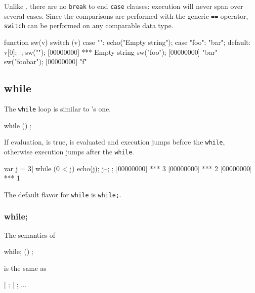 Unlike \C, there are no \lstinline|break| to end \lstinline|case|
clauses: execution will never span over several cases.  Since the
comparisons are performed with the generic \lstinline|==| operator,
\lstinline|switch| can be performed on any comparable data type.

\begin{urbiscript}[firstnumber=last]
function sw(v)
{
  switch (v)
  {
    case "":
      echo("Empty string");
    case "foo":
      "bar";
    default:
      v[0];
  }
}|;
sw("");
[00000000] *** Empty string
sw("foo");
[00000000] "bar"
sw("foobar");
[00000000] "f"
\end{urbiscript}

\subsection{while}

The \lstinline|while| loop is similar to \C's one.

\begin{urbiunchecked}[frame=, backgroundcolor=, ]
while ()
  ;
\end{urbiunchecked}

If  evaluation, is true,  is evaluated and
execution jumps before the \lstinline|while|, otherwise execution
jumps after the \lstinline|while|.

\begin{urbiscript}[firstnumber=last]
var j = 3|
while (0 < j)
{
  echo(j);
  j--;
};
[00000000] *** 3
[00000000] *** 2
[00000000] *** 1
\end{urbiscript}

The default flavor for \lstinline|while| is \lstinline|while;|.

\subsubsection{while;}

The semantics of

\begin{urbiunchecked}[frame=, backgroundcolor=, ]
while; ()
  ;
\end{urbiunchecked}

\noindent
is the same as

\begin{urbiunchecked}[frame=, backgroundcolor=, ]
 |  ;  |  ; ...
\end{urbiunchecked}

